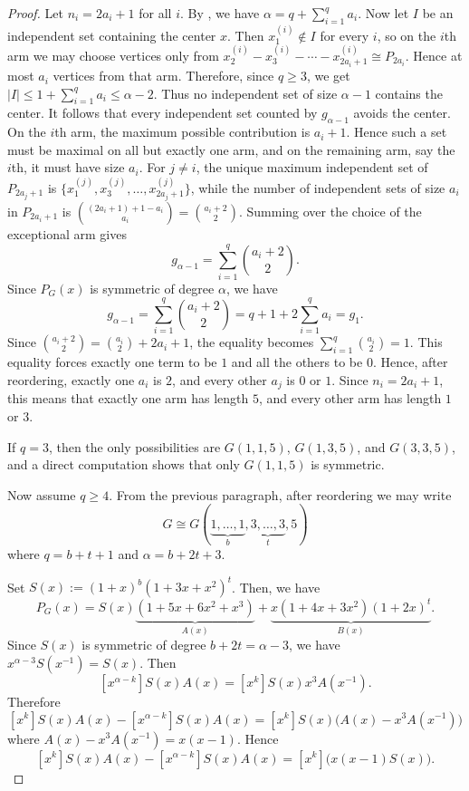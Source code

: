 \documentclass[12pt]{amsart}
\theoremstyle{plain}
\theoremstyle{definition}
\begin{document}
\begin{proof}
Let \(n_i=2a_i+1\) for all \(i\). By , we have $\alpha
=q+\sum_{i=1}^q a_i$. Now let \(I\) be an independent set containing the center \(x\). Then \(x^{(i)}_1\notin I\) for every \(i\), so on the \(i\)th arm we may choose vertices only from $x^{(i)}_2-x^{(i)}_3-\cdots-x^{(i)}_{2a_i+1}\cong P_{2a_i}$. Hence at most \(a_i\) vertices from that arm. Therefore, since \(q\ge 3\), we get $|I|\le   1+\sum_{i=1}^q a_i
\le \alpha-2$. Thus no independent set of size \(\alpha-1\) contains the center. It follows that every independent set counted by \(g_{\alpha-1}\) avoids the center. On the \(i\)th arm, the maximum possible contribution is \(a_i+1\).  Hence such a set must be maximal on all but exactly one arm, and on the remaining arm, say the \(i\)th, it must have size \(a_i\). For \(j\neq i\), the unique maximum independent set of \(P_{2a_j+1}\) is
\( \{x^{(j)}_1,x^{(j)}_3,\ldots,x^{(j)}_{2a_j+1}\}
\),
while the number of independent sets of size \(a_i\) in \(P_{2a_i+1}\) is
\(\binom{(2a_i+1)+1-a_i}{a_i}=\binom{a_i+2}{2}\).
Summing over the choice of the exceptional arm gives
\[
g_{\alpha-1}=\sum_{i=1}^q \binom{a_i+2}{2}.
\]
Since \(P_G(x)\) is symmetric of degree \(\alpha\), we have  
\[
g_{\alpha-1}= \sum_{i=1}^q \binom{a_i+2}{2}
=
q+1+2\sum_{i=1}^q a_i=g_1.
\]
Since $\binom{a_i+2}{2}=\binom{a_i}{2}+2a_i+1$,
the equality becomes $\sum_{i=1}^q \binom{a_i}{2}=1$. This equality forces exactly one term to be \(1\) and all the others to be \(0\). Hence, after reordering, exactly one \(a_i\) is \(2\), and every other \(a_j\) is \(0\) or \(1\). Since \(n_i=2a_i+1\), this means that exactly one arm has length \(5\), and every other arm has length \(1\) or \(3\). 


If \(q=3\), then the only possibilities are \(G(1,1,5)\), \(G(1,3,5)\), and \(G(3,3,5)\),
and a direct computation shows that only \(G(1,1,5)\) is symmetric.


Now assume \(q\ge 4\). From the previous paragraph, after reordering we may write
\[
G\cong G(\underbrace{1,\ldots,1}_{b},\underbrace{3,\ldots,3}_{t},5)
\]
where $q=b+t+1$ and $\alpha=b+2t+3$. 


Set $S(x):=(1+x)^b(1+3x+x^2)^t$. 
Then, we have 
\[
P_G(x)=S(x)\underbrace{(1+5x+6x^2+x^3)}_{A(x)}+\underbrace{x(1+4x+3x^2)(1+2x)^t}_{B(x)}.
\]
Since \(S(x)\) is symmetric of degree \(b+2t=\alpha-3\), we have $x^{\alpha-3}S(x^{-1})=S(x)$. Then
\[
[x^{\alpha-k}]S(x)A(x)=[x^k]S(x)x^3A(x^{-1}).
\]
Therefore
\[
[x^k]S(x)A(x)-[x^{\alpha-k}]S(x)A(x)
=
[x^k]S(x)\bigl(A(x)-x^3A(x^{-1})\bigr)
\]
where  $A(x)-x^3A(x^{-1})= x(x-1)$.
Hence
\[
[x^k]S(x)A(x)-[x^{\alpha-k}]S(x)A(x)
=
[x^k]\bigl(x(x-1)S(x)\bigr).
\]


\end{proof}
\end{document}
